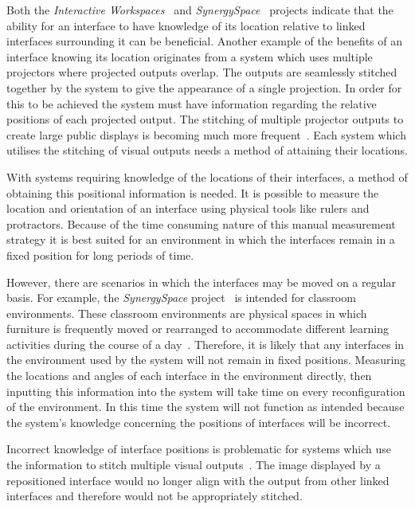 \documentclass{bmcart}
\begin{document}
Both the {\emph{Interactive Workspaces}}~\cite{Johanson2002} and {\emph{SynergySpace}}~\cite{Burd2009} projects indicate that the ability for an interface to have knowledge of its location relative to linked interfaces surrounding it can be beneficial.
Another example of the benefits of an interface knowing its location originates from a system which uses multiple projectors where projected outputs overlap.
The outputs are seamlessly stitched together by the system to give the appearance of a single projection.
In order for this to be achieved the system must have information regarding the relative positions of each projected output.
The stitching of multiple projector outputs to create large public displays is becoming much more frequent~\cite{Jones2011}.
Each system which utilises the stitching of visual outputs needs a method of attaining their locations.

With systems requiring knowledge of the locations of their interfaces, a method of obtaining this positional information is needed.
It is possible to measure the location and orientation of an interface using physical tools like rulers and protractors. 
Because of the time consuming nature of this manual measurement strategy it is best suited for an environment in which the interfaces remain in a fixed position for long periods of time.

However, there are scenarios in which the interfaces may be moved on a regular basis.
For example, the {\emph{SynergySpace}} project~\cite{Burd2009} is intended for classroom environments.
These classroom environments are physical spaces in which furniture is frequently moved or rearranged to accommodate different learning activities during the course of a day~\cite{Tiburcio2005}.
Therefore, it is likely that any interfaces in the environment used by the system will not remain in fixed positions.
Measuring the locations and angles of each interface in the environment directly, then inputting this information into the system will take time on every reconfiguration of the environment.
In this time the system will not function as intended because the system's knowledge concerning the positions of interfaces will be incorrect.

Incorrect knowledge of interface positions is problematic for systems which use the information to stitch multiple visual outputs~\cite{Dietz2004,Jones2011}.
The image displayed by a repositioned interface would no longer align with the output from other linked interfaces and therefore would not be appropriately stitched.
\end{document}
